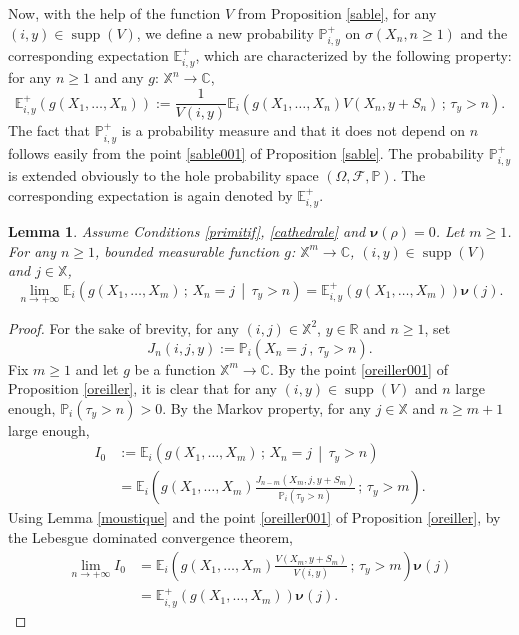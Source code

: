 \documentclass[12pt]{amsart}
\newtheorem{lemma}[theorem]{Lemma}
\theoremstyle{definition}
\numberwithin{equation}{section}
\newcommand*{\sachant}[2]{\left.#1 \,\middle|\,#2\right.}
\def\bb#1{\mathbb{#1}}
\def\bs#1{\boldsymbol{#1}}
\def\scr#1{\mathscr{#1}}
\def\geq{\geqslant}
\DeclareMathOperator{\supp}{supp}
\begin{document}
Now, with the help of the function $V$ from Proposition \ref{sable}, for any $(i,y) \in \supp(V)$, 
we define a new probability $\bb P_{i,y}^+$  on $\sigma\left( X_n, n \geq 1 \right)$ 
and the corresponding expectation $\bb E_{i,y}^+$, 
which are characterized by the following property: 
for any $n \geq 1$ and any $g$: $\bb X^n \to \bb C$,
\begin{equation}
	\label{soif}
	\bb E_{i,y}^+ \left( g \left( X_1, \dots, X_n \right) \right) := \frac{1}{V(i,y)} \bb E_i \left( g\left( X_1, \dots, X_n \right) V\left( X_n, y+S_n \right) \,;\, \tau_y > n \right).
\end{equation}
The fact that $\bb P_{i,y}^+$ is a probability measure and that it does not depend on  $n$ 
follows easily from the point \ref{sable001} of Proposition \ref{sable}.
The probability $\bb P_{i,y}^+$  is extended obviously to the hole 
probability space $\left( \Omega, \scr F, \bb P \right)$.
The corresponding expectation is again denoted by $\bb E_{i,y}^+$.

\begin{lemma} \label{cumulus}
Assume Conditions \ref{primitif}, \ref{cathedrale} and $\bs \nu(\rho) = 0$.
Let $m \geq 1$. For any $n \geq 1$, bounded measurable function $g$: $\bb X^m \to \bb C$, $(i,y) \in \supp(V)$ and $j \in \bb X$,
\[
\lim_{n\to +\infty} \bb E_i \left( \sachant{g\left( X_1, \dots, X_m \right) 
\,;\, X_n = j}{ \tau_y > n } \right) 
= \bb E_{i,y}^+ \left( g\left( X_1, \dots, X_m \right) 
\right) \bs \nu (j).
\]
\end{lemma}

\begin{proof}
For the sake of brevity, for any $(i,j) \in \bb X^2$, $y \in \bb R$ and $n \geq 1$, set
\[
J_n(i,j,y) := \bb P_i \left( X_n = j \,,\, \tau_y > n \right).
\]
Fix $m \geq 1$ and let $g$ be a function $\bb X^m \to \bb C$. By the point \ref{oreiller001} of Proposition \ref{oreiller}, it is clear that for any $(i,y) \in \supp(V)$ and $n$ large enough, $\bb P_i \left( \tau_y > n \right) > 0$. By the Markov property, for any $j \in \bb X$ 
and $n \geq m+1$ large enough,
\begin{align*}
I_0 &:= \bb E_i \left( \sachant{g\left( X_1, \dots, X_m \right)
 \,;\, X_n = j}{ \tau_y > n } \right)\\ 
&= \bb E_i \left( g\left( X_1, \dots, X_m \right) 
\frac{J_{n-m} \left( X_m,j,y+S_m \right)}{\bb P_i \left( \tau_y > n \right)} \,;\, \tau_y > m \right).
\end{align*}
Using Lemma \ref{moustique} and the point \ref{oreiller001} of Proposition \ref{oreiller}, by the Lebesgue dominated convergence theorem,
\begin{align*}
	\lim_{n\to+\infty} I_0 &= \bb E_i \left( g\left( X_1, \dots, X_m \right) \frac{V \left( X_m,y+S_m \right)}{V(i,y)} \,;\, \tau_y > m \right) \bs \nu(j) \\
	&= \bb E_{i,y}^+ \left( g\left( X_1, \dots, X_m \right) \right) \bs \nu (j).
\end{align*}

\end{proof}
\end{document}
